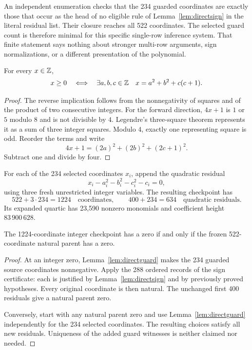 An independent enumeration checks that the 234 guarded coordinates
are exactly those that occur as the head of no eligible rule of
Lemma~\ref{lem:directsign} in the literal residual list. Their closure
reaches all 522 coordinates. The selected guard count is therefore
minimal for this specific single-row inference system. That finite
statement says nothing about stronger multi-row arguments, sign
normalizations, or a different presentation of the polynomial.

\begin{lemma}\label{lem:directguard}
For every $x\in\mathbb Z$,
\[
 x\ge0\quad\Longleftrightarrow\quad
 \exists a,b,c\in\mathbb Z\quad x=a^2+b^2+c(c+1).
\]
\end{lemma}
\begin{proof}
The reverse implication follows from the nonnegativity of squares and
of the product of two consecutive integers. For the forward direction,
$4x+1$ is $1$ or $5$ modulo $8$ and is not divisible by $4$.
Legendre's three-square theorem represents it as a sum of three integer
squares. Modulo $4$, exactly one representing square is odd. Reorder
the terms and write
\[
 4x+1=(2a)^2+(2b)^2+(2c+1)^2.
\]
Subtract one and divide by four.
\end{proof}

For each of the 234 selected coordinates $x_i$, append the quadratic
residual
\begin{equation}\label{eq:directguard}
 x_i-a_i^2-b_i^2-c_i^2-c_i=0,
\end{equation}
using three fresh unrestricted integer variables. The resulting
checkpoint has
\[
 522+3\cdot234=1224\quad\text{coordinates},\qquad
 400+234=634\quad\text{quadratic residuals}.
\]
Its expanded quartic has 23,590 nonzero monomials and coefficient
height $83\,900\,628$.

\begin{proposition}
\label{prop:directdomain}
The 1224-coordinate integer checkpoint has a zero if and only if the
frozen 522-coordinate natural parent has a zero.
\end{proposition}
\begin{proof}
At an integer zero, Lemma~\ref{lem:directguard} makes the 234 guarded
source coordinates nonnegative. Apply the 288 ordered records of the
sign certificate: each is justified by Lemma~\ref{lem:directsign} and
by previously proved hypotheses. Every original coordinate is then
natural. The unchanged first 400 residuals give a natural parent zero.

Conversely, start with any natural parent zero and use
Lemma~\ref{lem:directguard} independently for the 234 selected
coordinates. The resulting choices satisfy all new residuals.
Uniqueness of the added guard witnesses is neither claimed nor needed.
\end{proof}

